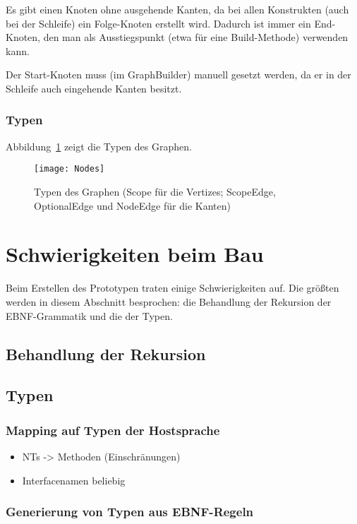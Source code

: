 \documentclass[../InterneDSLs.tex]{subfiles}
\begin{document}
Es gibt einen Knoten ohne ausgehende Kanten, da bei allen Konstrukten (auch bei der Schleife) ein Folge-Knoten erstellt wird. Dadurch ist immer ein End-Knoten, den man als Ausstiegspunkt (etwa für eine Build-Methode) verwenden kann.

Der Start-Knoten muss (im GraphBuilder) manuell gesetzt werden, da er in der Schleife auch eingehende Kanten besitzt.

\subsubsection{Typen}
Abbildung~\ref{FIG:GraphTypes} zeigt die Typen des Graphen.
\begin{figure}[ht]
\centering
\texttt{[image: Nodes]}
\caption{Typen des Graphen (Scope für die Vertizes; ScopeEdge, OptionalEdge und NodeEdge für die Kanten)}
\label{FIG:GraphTypes}
\end{figure}


\section{Schwierigkeiten beim Bau}
Beim Erstellen des Prototypen traten einige Schwierigkeiten auf. Die größten werden in diesem Abschnitt besprochen: die Behandlung der Rekursion der EBNF-Grammatik und die der Typen.

\subsection{Behandlung der Rekursion}

\subsection{Typen}

\subsubsection{Mapping auf Typen der Hostsprache}
\begin{itemize}
	\item NTs -> Methoden (Einschränungen)
	\item Interfacenamen beliebig
\end{itemize}

\subsubsection{Generierung von Typen aus EBNF-Regeln}
\end{document}
